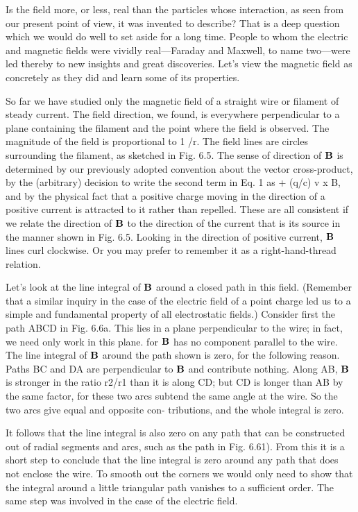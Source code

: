 Is the field more, or less, real than the particles whose interaction,
as seen from our present point of view, it was invented to describe?
That is a deep question which we would do well to set aside for a long
time. People to whom the electric and magnetic fields were vividly
real---Faraday and Maxwell, to name two---were led thereby to new
insights and great discoveries. Let's view the magnetic field as concretely
as they did and learn some of its properties.

So far we have studied only the magnetic field of a straight wire
or filament of steady current. The field direction, we found, is everywhere
perpendicular to a plane containing the filament and the point
where the field is observed. The magnitude of the field is proportional
to 1 /r. The field lines are circles surrounding the filament, as
sketched in Fig. 6.5. The sense of direction of $\mathbf{B}$ is determined by our
previously adopted convention about the vector cross-product, by
the (arbitrary) decision to write the second term in Eq. 1 as
+ (q/c) v x B, and by the physical fact that a positive charge moving
in the direction of a positive current is attracted to it rather than
repelled. These are all consistent if we relate the direction of $\mathbf{B}$ to
the direction of the current that is its source in the manner shown
in Fig. 6.5. Looking in the direction of positive current, $\mathbf{B}$ lines curl
clockwise. Or you may prefer to remember it as a right-hand-thread
relation.

Let's look at the line integral of $\mathbf{B}$ around a closed path in this field.
(Remember that a similar inquiry in the case of the electric field of
a point charge led us to a simple and fundamental property of all
electrostatic fields.) Consider first the path ABCD in Fig. 6.6a. This
lies in a plane perpendicular to the wire; in fact, we need only work
in this plane. for $\mathbf{B}$ has no component parallel to the wire. The line
integral of $\mathbf{B}$ around the path shown is zero, for the following reason.
Paths BC and DA are perpendicular to $\mathbf{B}$ and contribute nothing.
Along AB, $\mathbf{B}$ is stronger in the ratio r2/r1 than it is along CD; but CD
is longer than AB by the same factor, for these two arcs subtend the
same angle at the wire. So the two arcs give equal and opposite con-
tributions, and the whole integral is zero.

It follows that the line integral is also zero on any path that can
be constructed out of radial segments and arcs, such as the path in
Fig. 6.61). From this it is a short step to conclude that the line integral
is zero around any path that does not enclose the wire. To smooth
out the corners we would only need to show that the integral around
a little triangular path vanishes to a sufficient order. The same step
was involved in the case of the electric field.


